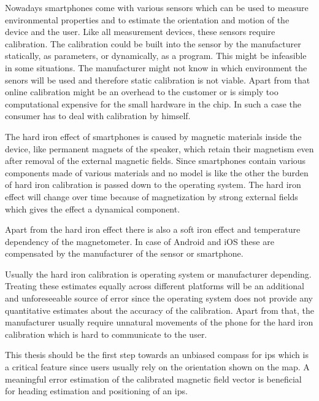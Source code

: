
Nowadays smartphones come with various sensors which can be used to measure environmental properties and to estimate the orientation and motion of the device and the user. Like all measurement devices, these sensors require calibration. The calibration could be built into the sensor by the manufacturer statically, as parameters, or dynamically, as a program. This might be infeasible in some situations. The manufacturer might not know in which environment the senors will be used and therefore static calibration is not viable. Apart from that online calibration might be an overhead to the customer or is simply too computational expensive for the small hardware in the chip. In such a case the consumer has to deal with calibration by himself.

The hard iron effect of smartphones is caused by magnetic materials inside the device, like permanent magnets of the speaker, which retain their magnetism even after removal of the external magnetic fields. Since smartphones contain various components made of various materials and no model is like the other the burden of hard iron calibration is passed down to the operating system. The hard iron effect will change over time because of magnetization by strong external fields which gives the effect a dynamical component.

Apart from the hard iron effect there is also a soft iron effect and temperature dependency of the magnetometer. In case of Android and iOS these are compensated by the manufacturer of the sensor or smartphone.\cite{android_sdk_sensorevent}

Usually the hard iron calibration is operating system or manufacturer depending. Treating these estimates equally across different platforms will be an additional and unforeseeable source of error since the operating system does not provide any quantitative estimates about the accuracy of the calibration. Apart from that, the manufacturer usually require unnatural movements of the phone for the hard iron calibration which is hard to communicate to the user.

This thesis should be the first step towards an unbiased compass for \gls{ips} which is a critical feature since users usually rely on the orientation shown on the map. A meaningful error estimation of the calibrated magnetic field vector is beneficial for heading estimation and positioning of an \gls{ips}.


